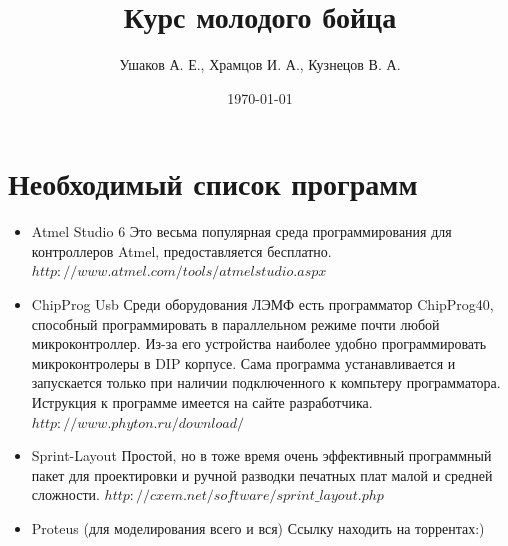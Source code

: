\documentclass[12pt]{article}
\title{Курс молодого бойца}
\author{Ушаков А. Е., Храмцов И. А., Кузнецов В. А.}
\date{\today}
\begin{document}
\maketitle


\newpage
\tableofcontents
\newpage
\section{Необходимый список программ}
\begin{itemize}
\item Atmel Studio 6
\newline Это весьма популярная среда программирования для контроллеров Atmel, предоставляется бесплатно.
\newline $http://www.atmel.com/tools/atmelstudio.aspx$
\item ChipProg Usb
\newline Среди оборудования ЛЭМФ есть программатор ChipProg40, способный программировать в параллельном режиме почти любой микроконтроллер.
Из-за его устройства наиболее удобно программировать микроконтролеры в DIP корпусе.
Сама программа устанавливается и запускается только при наличии подключенного к компьтеру программатора.
Иструкция к программе имеется на сайте разработчика.
\newline $http://www.phyton.ru/download/$
\item Sprint-Layout
\newline Простой, но в тоже время очень эффективный программный пакет для проектировки и ручной разводки печатных плат малой и средней сложности.
\newline $http://cxem.net/software/sprint\_layout.php$
\item Proteus (для моделирования всего и вся) Ссылку находить на торрентах:)
\end{itemize}
\end{document}
